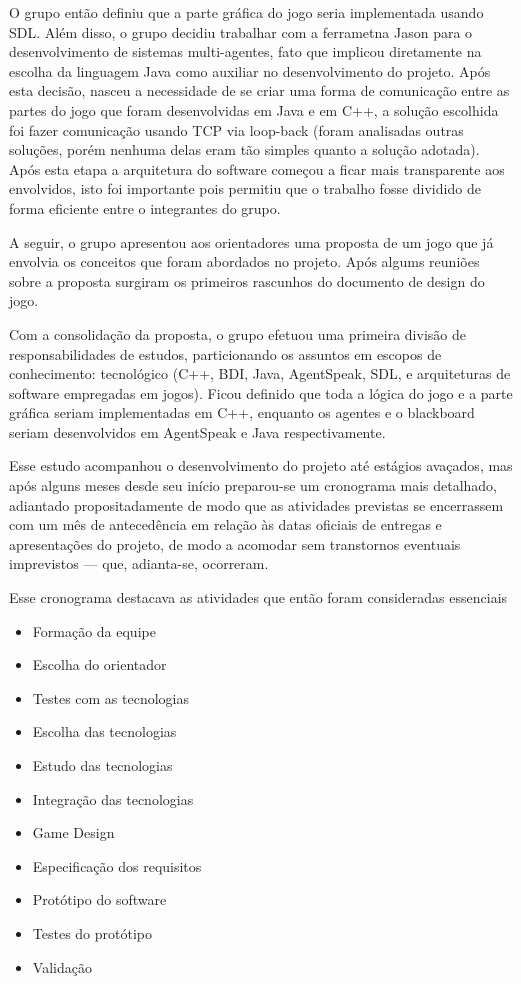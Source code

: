 O grupo então definiu que a parte gráfica do jogo seria implementada usando SDL. Além disso, o grupo decidiu trabalhar com a ferrametna Jason para o desenvolvimento de sistemas multi-agentes, fato que implicou diretamente na escolha da linguagem Java como auxiliar no desenvolvimento do projeto.
Após esta decisão, nasceu a necessidade de se criar uma forma de comunicação entre as partes do jogo que foram desenvolvidas em Java e em C++, a solução escolhida foi fazer comunicação usando TCP via loop-back (foram analisadas outras soluções, porém nenhuma delas eram tão simples quanto a solução adotada). Após esta etapa a arquitetura do software começou a ficar mais transparente aos envolvidos, isto foi importante pois permitiu que o trabalho fosse dividido de forma eficiente entre o integrantes do grupo.

A seguir, o grupo apresentou aos orientadores uma proposta de um jogo que já envolvia os conceitos que foram abordados no projeto. Após algums reuniões sobre a proposta surgiram os primeiros rascunhos do documento de design do jogo.

Com a consolidação da proposta, o grupo efetuou uma primeira divisão de responsabilidades de estudos, particionando os assuntos em escopos de conhecimento: tecnológico (C++, BDI, Java, AgentSpeak, SDL, e arquiteturas de software empregadas em jogos).
Ficou definido que toda a lógica do jogo e a parte gráfica seriam implementadas em C++, enquanto os agentes e o blackboard seriam desenvolvidos em AgentSpeak e Java respectivamente.

Esse estudo acompanhou o desenvolvimento do projeto até estágios avaçados, mas após alguns meses desde seu início preparou-se um cronograma mais detalhado, adiantado propositadamente de modo que as atividades previstas se encerrassem com um mês de antecedência em relação às datas oficiais de entregas e apresentações do projeto, de modo a acomodar sem transtornos eventuais imprevistos --- que, adianta-se, ocorreram.

Esse cronograma destacava as atividades que então foram consideradas essenciais
\begin{itemize}
\item Formação da equipe
\item Escolha do orientador
\item Testes com as tecnologias
\item Escolha das tecnologias
\item Estudo das tecnologias
\item Integração das tecnologias
\item Game Design
\item Especificação dos requisitos
\item Protótipo do software
\item Testes do protótipo
\item Validação
\end{itemize}


